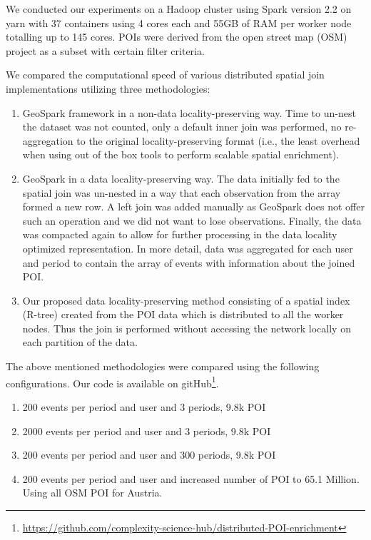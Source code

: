 \documentclass[conference]{IEEEtran}
\begin{document}
We conducted our experiments on a Hadoop cluster using Spark version 2.2 on yarn with 37 containers using 4 cores each and 55GB of RAM per worker node totalling up to 145 cores. 
POIs were derived from the open street map (OSM) project as a subset with certain filter criteria.

We compared the computational speed of various distributed spatial join implementations utilizing three methodologies: 
\begin{enumerate}
  \item GeoSpark framework in a non-data locality-preserving way. Time to un-nest the dataset was not counted, only a default inner join was performed, no re-aggregation to the original locality-preserving format (i.e., the least overhead when using out of the box tools to perform scalable spatial enrichment).
  \item GeoSpark in a data locality-preserving way. The data initially fed to the spatial join was un-nested in a way that each observation from the array formed a new row. A left join was added manually as GeoSpark does not offer such an operation and we did not want to lose observations. Finally, the data was compacted again to allow for further processing in the data locality optimized representation. In more detail, data was aggregated for each user and period to contain the array of events with information about the joined POI.
  \item Our proposed data locality-preserving method consisting of a spatial index (R-tree) created from the POI data which is distributed to all the worker nodes.
  Thus the join is performed without accessing the network locally on each partition of the data.
\end{enumerate}

The above mentioned methodologies were compared using the following configurations.
Our code is available on gitHub\footnote{\url{https://github.com/complexity-science-hub/distributed-POI-enrichment}}.
\begin{enumerate}[label=(\alph*)]
	\item 200 events per period and user and 3 periods, 9.8k POI
	\item 2000 events per period and user and 3 periods, 9.8k POI
	\item 200 events per period and user and 300 periods, 9.8k POI
	\item 200 events per period and user and increased number of POI to 65.1 Million. Using all OSM POI for Austria.
\end{enumerate}
\end{document}
